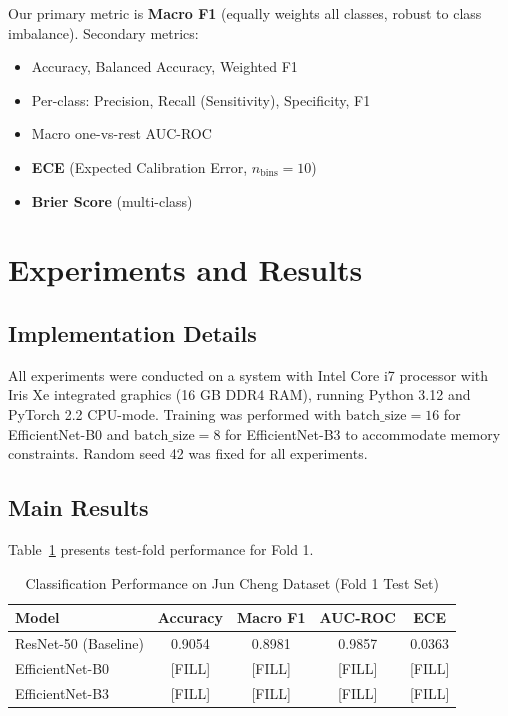 \documentclass[journal]{IEEEtran}
\begin{document}
Our primary metric is \textbf{Macro F1} (equally weights all classes, robust to class imbalance).
Secondary metrics:
\begin{itemize}
  \item Accuracy, Balanced Accuracy, Weighted F1
  \item Per-class: Precision, Recall (Sensitivity), Specificity, F1
  \item Macro one-vs-rest AUC-ROC
  \item \textbf{ECE} (Expected Calibration Error, $n_{\text{bins}}=10$)
  \item \textbf{Brier Score} (multi-class)
\end{itemize}

\section{Experiments and Results}
\label{sec:results}

\subsection{Implementation Details}

All experiments were conducted on a system with Intel Core i7 processor with Iris Xe integrated
graphics (16 GB DDR4 RAM), running Python 3.12 and PyTorch 2.2 CPU-mode. Training was performed
with $\text{batch\_size}=16$ for EfficientNet-B0 and $\text{batch\_size}=8$ for EfficientNet-B3
to accommodate memory constraints. Random seed 42 was fixed for all experiments.

\subsection{Main Results}

Table~\ref{tab:main_results} presents test-fold performance for Fold 1.

\begin{table}[!h]
\caption{Classification Performance on Jun Cheng Dataset (Fold 1 Test Set)}
\label{tab:main_results}
\centering
\begin{tabular}{lcccc}
\hline
\textbf{Model} & \textbf{Accuracy} & \textbf{Macro F1} & \textbf{AUC-ROC} & \textbf{ECE} \\
\hline
ResNet-50 (Baseline) & 0.9054 & 0.8981 & 0.9857 & 0.0363 \\
EfficientNet-B0 & [FILL] & [FILL] & [FILL] & [FILL] \\
EfficientNet-B3 & [FILL] & [FILL] & [FILL] & [FILL] \\
\hline
\end{tabular}
\end{table}
\end{document}
